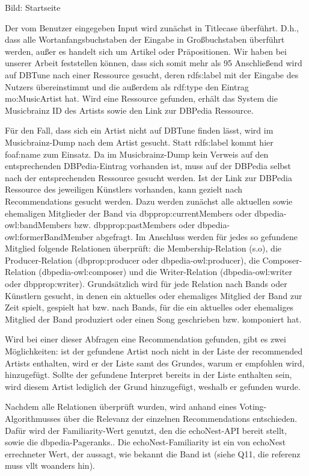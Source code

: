 Bild: Startseite


Der vom Benutzer eingegeben Input wird zunächst in Titlecase überführt. D.h., dass alle Wortanfangsbuchstaben der Eingabe in Großbuchstaben überführt werden, außer es handelt sich um Artikel oder Präpositionen. Wir haben bei unserer Arbeit feststellen können, dass sich somit mehr als 95%
Anschließend wird auf DBTune nach einer Ressource gesucht, deren rdfs:label mit der Eingabe des Nutzers übereinstimmt und die außerdem als rdf:type den Eintrag mo:MusicArtist hat. Wird eine Ressource gefunden, erhält das System die Musicbrainz ID des Artists sowie den Link zur DBPedia Ressource.

Für den Fall, dass sich ein Artist nicht auf DBTune finden lässt, wird im Musicbrainz-Dump nach dem Artist gesucht. Statt rdfs:label kommt hier foaf:name zum Einsatz. Da im Musicbrainz-Dump kein Verweis auf den entsprechenden DBPedia-Eintrag vorhanden ist, muss auf der DBPedia selbst nach der entsprechenden Ressource gesucht werden.
Ist der Link zur DBPedia Ressource des jeweiligen Künstlers vorhanden, kann gezielt nach Recommendations gesucht werden. Dazu werden zunächst alle aktuellen sowie ehemaligen Mitglieder der Band via dbpprop:currentMembers oder dbpedia-owl:bandMembers  bzw. dbpprop:pastMembers oder dbpedia-owl:formerBandMember abgefragt. Im Anschluss werden für jedes so gefundene Mitglied folgende Relationen überprüft: die Membership-Relation (s.o), die Producer-Relation (dbprop:producer oder dbpedia-owl:producer), die Composer-Relation (dbpedia-owl:composer) und die Writer-Relation (dbpedia-owl:writer oder dbpprop:writer). Grundsätzlich wird für jede Relation nach Bands oder Künstlern gesucht, in denen ein aktuelles oder ehemaliges Mitglied der Band zur Zeit spielt, gespielt hat bzw. nach Bands, für die ein aktuelles oder ehemaliges Mitglied der Band produziert oder einen Song geschrieben bzw. komponiert hat. 

Wird bei einer dieser Abfragen eine Recommendation gefunden, gibt es zwei Möglichkeiten: ist der gefundene Artist noch nicht in der Liste der recommended Artists enthalten, wird er der Liste samt des Grundes, warum er empfohlen wird, hinzugefügt. Sollte der gefundene Interpret bereits in der Liste enthalten sein, wird diesem Artist lediglich der Grund hinzugefügt, weshalb er gefunden wurde. 

Nachdem alle Relationen überprüft wurden, wird anhand eines Voting-Algorithmusses über die Relevanz der einzelnen Recommendations entschieden. Dafür wird der Familiarity-Wert genutzt, den die echoNest-API bereit stellt, sowie die dbpedia-Pageranks.. Die echoNest-Familiarity ist ein von echoNest errechneter Wert, der aussagt, wie bekannt die Band ist (siehe Q11, die referenz muss vllt woanders hin).

